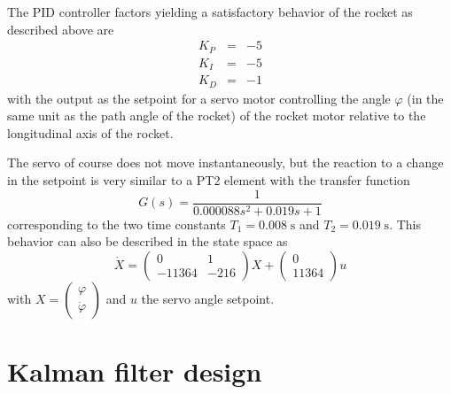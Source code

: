 \documentclass[a4paper]{article}
\renewcommand{\u}[1]{\;\mathrm{#1}}
\begin{document}
The PID controller factors yielding a satisfactory behavior of the rocket as described above are \begin{eqnarray}
K_P & = & -5 \\
K_I & = & -5 \\
K_D & = & -1
\end{eqnarray}
with the output as the setpoint for a servo motor controlling the angle $\varphi$ (in the same unit as the path angle of the rocket) of the rocket motor relative to the longitudinal axis of the rocket. 

The servo of course does not move instantaneously, but the reaction to a change in the setpoint is very similar to a PT2 element with the transfer function \begin{equation}G(s) = \frac{1}{0.000088 s^2 + 0.019 s + 1}\end{equation}corresponding to the two time constants $T_1 = 0.008\u{s}$ and $T_2=0.019\u{s}$. This behavior can also be described in the state space as \begin{equation}\dot{X} = \begin{pmatrix}0 & 1 \\ -11364 & -216\end{pmatrix} X + \begin{pmatrix}0 \\ 11364\end{pmatrix} u\label{eq:servo}\end{equation} with $X=\begin{pmatrix}\varphi \\ \dot{\varphi}\end{pmatrix}$ and $u$ the servo angle setpoint.

\section{Kalman filter design}
\end{document}
